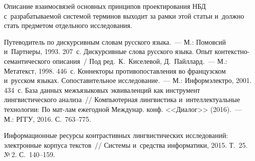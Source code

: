 \begin{multicols}{2}
   Описание взаимосвязей основных принципов проектирования НБД 
с~разрабатываемой системой терминов выходит за рамки этой статьи и~должно 
стать предметом отдельного исследования.

   
{\small\frenchspacing
 {%
 \begin{thebibliography}{99}
 
 Путеводитель по 
дискурсивным словам русского языка.~--- М.:
Помовсий и~Партнеры, 1993. 207~с.
Дискурсивные слова русского языка. Опыт  
кон\-текст\-но-се\-ман\-ти\-че\-ско\-го описания~/ Под ред.\ К.~Киселевой, 
Д.~Пайллард.~--- М.: Метатекст, 1998. 446~с.
 Коннекторы противопоставления во 
французском и~русском языках. Сопоставительное исследование.~--- М.: 
Информэлектро, 2001. 434~с.
 База данных межъязыковых эквиваленций как 
инструмент лингвистического анализа~// Компьютерная лингвистика 
и~интеллектуальные технологии: По мат-лам ежегодной Междунар. конф. 
<<Диалог>> (2016).~--- М.: РГГУ, 2016. С.~763--775.



 Информационные ресурсы контрастивных 
лингвистических исследований: электронные корпуса текстов~// Системы 
и~средства информатики, 2015. Т.~25. №\,2. С.~140--159.

\columnbreak


\end{thebibliography}}}
\end{multicols}
